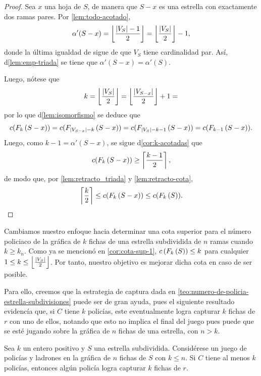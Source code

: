 \begin{proof}
    Sea $x$ una hoja de $S$, de manera que $S-x$ es una estrella con exactamente
    dos ramas pares. Por \cref{lem:todo-acotado},
    \[
        \alpha'(S-x) = \left\lfloor\frac{\left|V_S\right|-1}{2}\right\rfloor = 
        \left\lfloor\frac{\left|V_S\right|}{2}\right\rfloor - 1,
    \]
    donde la \'ultima igualdad de sigue de que $V_S$ tiene cardinalidad par.
    As\'i, d\cref{lem:emp-triada} se tiene que $\alpha'(S-x)=\alpha'(S)$.

    Luego, n\'otese que 
    \[
        k = \left\lfloor\frac{\left|V_S\right|}{2}\right\rfloor = 
        \left\lfloor\frac{\left|V_{S-x}\right|}{2}\right\rfloor + 1 = 
    \]
    por lo que d\cref{lem:isomorfismo} se deduce que
    \[
        c(F_{k}\left( S-x\right)) = c(F_{\left|V_{S-x}\right|-k}\left( S-x\right)) 
        = c(F_{\left|V_{S}\right|-k -1}\left( S-x\right)) = c(F_{k-1}\left( S-x\right)).
    \]
    Luego, como $k-1=\alpha'(S-x)$, se sigue d\cref{cor:k-acotadas} que
    \[
        c(F_{k}\left( S-x\right)) \geq \left\lceil\frac{k-1}{2}\right\rceil,
    \]
    de modo que, por \cref{lem:retracto_triada} y \cref{lem:retracto-cota},
    \[
        \left\lceil\frac{k}{2}\right\rceil\leq c(F_{k}\left( S-x\right)) \leq c(F_{k}\left( S\right)).
    \]
\end{proof}

Cambiamos nuestro enfoque hacia determinar una cota superior para el n\'umero
policiaco de la gr\'afica de $k$ fichas de una estrella subdividida de $n$ ramas
cuando $k\geq k_n$. Como ya se mencion\'o en \cref{cor:cota-sup-1},
$c\left( F_{k}\left( S\right)\right)\leq k$ para cualquier $1\leq k\leq
\left\lfloor\frac{\left|V_S\right|}{2}\right\rfloor$. Por tanto, nuestro objetivo es
mejorar dicha cota en caso de ser posible.

Para ello, creemos que la estrategia de captura dada en
\cref{teo:numero-de-policia-estrella-subdivisiones} puede ser de gran ayuda,
pues el siguiente resultado evidenc\'ia que, si $C$ tiene $k$ polic\'ias, este
eventualmente logra capturar $k$ fichas de $r$ con uno de ellos, notando que
esto no implica el final del juego pues puede que se est\'e jugando sobre la
gr\'afica de $n$ fichas de una estrella, con $n>k$.

\begin{proposicion}
\label{pro:k-captura}
    Sea $k$ un entero positivo y $S$ una estrella subdividida. Consid\'erese un
    juego de polic\'ias y ladrones en la gr\'afica de $n$ fichas de $S$ con $k
    \leq n$. Si $C$ tiene al menos $k$ polic\'ias, entonces alg\'un polic\'ia
    logra capturar $k$ fichas de $r$.
\end{proposicion}

